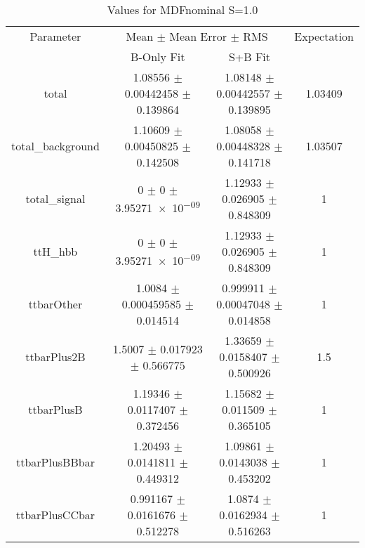 \begin{table}
\centering
\caption{Values for MDFnominal S=1.0}
\begin{tabular}{cccc}
\toprule
Parameter & \multicolumn{2}{c}{Mean $\pm$ Mean Error $\pm$ RMS} & Expectation\\
 & B-Only Fit & S+B Fit & \\
\midrule
total & \num{1.08556} $\pm$ \num{0.00442458} $\pm$ \num{0.139864} & \num{1.08148} $\pm$ \num{0.00442557} $\pm$ \num{0.139895} & \num{1.03409}\\
total\_background & \num{1.10609} $\pm$ \num{0.00450825} $\pm$ \num{0.142508} & \num{1.08058} $\pm$ \num{0.00448328} $\pm$ \num{0.141718} & \num{1.03507}\\
total\_signal & \num{0} $\pm$ \num{0} $\pm$ \num{3.95271e-09} & \num{1.12933} $\pm$ \num{0.026905} $\pm$ \num{0.848309} & \num{1}\\
ttH\_hbb & \num{0} $\pm$ \num{0} $\pm$ \num{3.95271e-09} & \num{1.12933} $\pm$ \num{0.026905} $\pm$ \num{0.848309} & \num{1}\\
ttbarOther & \num{1.0084} $\pm$ \num{0.000459585} $\pm$ \num{0.014514} & \num{0.999911} $\pm$ \num{0.00047048} $\pm$ \num{0.014858} & \num{1}\\
ttbarPlus2B & \num{1.5007} $\pm$ \num{0.017923} $\pm$ \num{0.566775} & \num{1.33659} $\pm$ \num{0.0158407} $\pm$ \num{0.500926} & \num{1.5}\\
ttbarPlusB & \num{1.19346} $\pm$ \num{0.0117407} $\pm$ \num{0.372456} & \num{1.15682} $\pm$ \num{0.011509} $\pm$ \num{0.365105} & \num{1}\\
ttbarPlusBBbar & \num{1.20493} $\pm$ \num{0.0141811} $\pm$ \num{0.449312} & \num{1.09861} $\pm$ \num{0.0143038} $\pm$ \num{0.453202} & \num{1}\\
ttbarPlusCCbar & \num{0.991167} $\pm$ \num{0.0161676} $\pm$ \num{0.512278} & \num{1.0874} $\pm$ \num{0.0162934} $\pm$ \num{0.516263} & \num{1}\\
\bottomrule
\end{tabular}
\end{table}